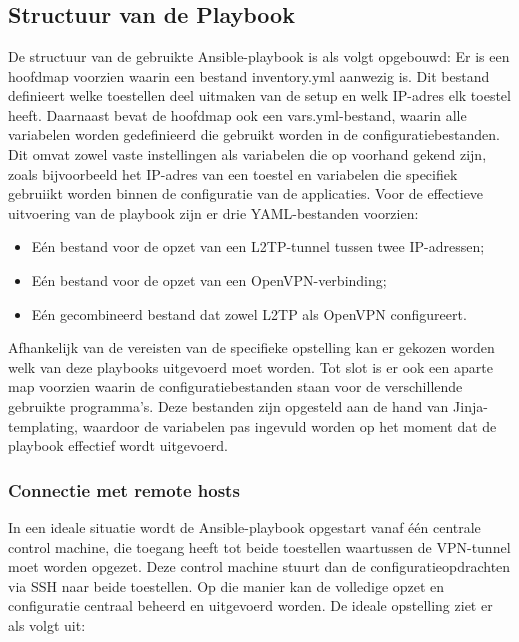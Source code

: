 \chapter{}%
\label{ch:automatisatie}

\section{Structuur van de Playbook}
\label{sec:playbookstructuur}

De structuur van de gebruikte Ansible-playbook is als volgt opgebouwd:
Er is een hoofdmap voorzien waarin een bestand inventory.yml aanwezig is. Dit bestand definieert welke toestellen deel uitmaken van de setup en welk IP-adres elk toestel heeft.
Daarnaast bevat de hoofdmap ook een vars.yml-bestand, waarin alle variabelen worden gedefinieerd die gebruikt worden in de configuratiebestanden. 
Dit omvat zowel vaste instellingen als variabelen die op voorhand gekend zijn, zoals bijvoorbeeld het IP-adres van een toestel en variabelen die specifiek gebruiikt worden binnen de configuratie van de applicaties.
Voor de effectieve uitvoering van de playbook zijn er drie YAML-bestanden voorzien:
\begin{itemize}
    \item Eén bestand voor de opzet van een L2TP-tunnel tussen twee IP-adressen;
    \item Eén bestand voor de opzet van een OpenVPN-verbinding;
    \item Eén gecombineerd bestand dat zowel L2TP als OpenVPN configureert.
\end{itemize}

Afhankelijk van de vereisten van de specifieke opstelling kan er gekozen worden welk van deze playbooks uitgevoerd moet worden.
Tot slot is er ook een aparte map voorzien waarin de configuratiebestanden staan voor de verschillende gebruikte programma's. 
Deze bestanden zijn opgesteld aan de hand van Jinja-templating, waardoor de variabelen pas ingevuld worden op het moment dat de playbook effectief wordt uitgevoerd.

\subsection{Connectie met remote hosts}

In een ideale situatie wordt de Ansible-playbook opgestart vanaf één centrale control machine, die toegang heeft tot beide toestellen waartussen de VPN-tunnel moet worden opgezet. 
Deze control machine stuurt dan de configuratieopdrachten via SSH naar beide toestellen. Op die manier kan de volledige opzet en configuratie centraal beheerd en uitgevoerd worden.
De ideale opstelling ziet er als volgt uit:


